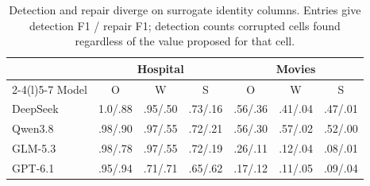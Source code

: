 \begin{table}[t]
  \caption{Detection and repair diverge on surrogate identity columns. Entries give detection F1 /
  repair F1; detection counts corrupted cells found regardless of the value proposed for that cell.}
  \label{tab:detection}
  \small
  \setlength{\tabcolsep}{3pt}
  \begin{tabular*}{\columnwidth}{@{\extracolsep{\fill}}l ccc ccc@{}}
    \toprule
    & \multicolumn{3}{c}{Hospital} & \multicolumn{3}{c}{Movies} \\
    \cmidrule(lr){2-4}\cmidrule(l){5-7}
    Model & O & W & S & O & W & S \\
    \midrule
    DeepSeek & 1.0/.88 & .95/.50 & .73/.16 & .56/.36 & .41/.04 & .47/.01 \\
    Qwen3.8 & .98/.90 & .97/.55 & .72/.21 & .56/.30 & .57/.02 & .52/.00 \\
    GLM-5.3 & .98/.78 & .97/.55 & .72/.19 & .26/.11 & .12/.04 & .08/.01 \\
    GPT-6.1 & .95/.94 & .71/.71 & .65/.62 & .17/.12 & .11/.05 & .09/.04 \\
    \bottomrule
  \end{tabular*}
\end{table}
